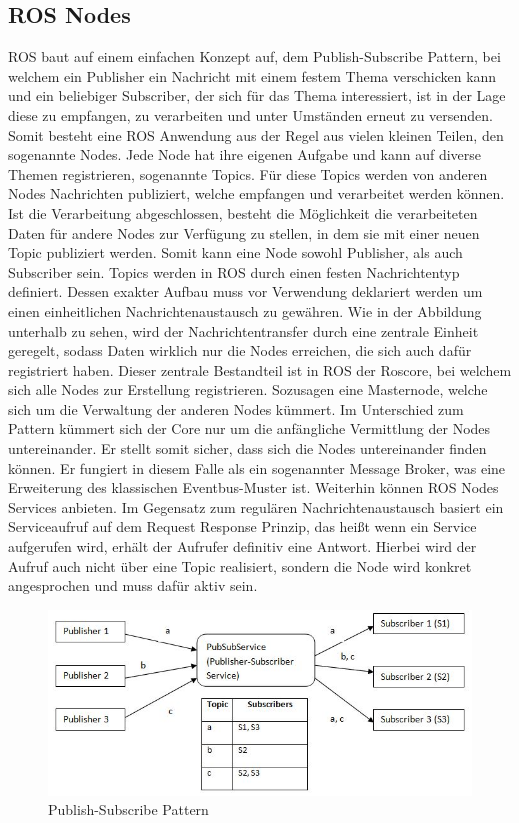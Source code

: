 \subsection{ROS Nodes}
ROS baut auf einem einfachen Konzept auf, dem Publish-Subscribe Pattern, bei welchem ein Publisher ein Nachricht mit einem festem Thema verschicken kann und ein beliebiger Subscriber, der sich für das Thema interessiert, ist in der Lage diese zu empfangen, zu verarbeiten und unter Umständen erneut zu versenden.  Somit besteht eine ROS Anwendung aus der Regel aus vielen kleinen Teilen, den sogenannte Nodes. Jede Node hat ihre eigenen Aufgabe und kann auf diverse Themen registrieren, sogenannte Topics. Für diese Topics werden von anderen Nodes Nachrichten publiziert, welche empfangen und verarbeitet werden können. Ist die Verarbeitung abgeschlossen, besteht die Möglichkeit die verarbeiteten Daten für andere Nodes zur Verfügung zu stellen, in dem sie mit einer neuen Topic publiziert werden. Somit kann eine Node sowohl Publisher, als auch Subscriber sein. 
Topics werden in ROS durch einen festen Nachrichtentyp definiert. Dessen exakter Aufbau muss vor Verwendung deklariert werden um einen einheitlichen Nachrichtenaustausch zu gewähren. Wie in der Abbildung unterhalb zu sehen, wird der Nachrichtentransfer durch eine zentrale Einheit geregelt, sodass Daten wirklich nur die Nodes erreichen, die sich auch dafür registriert haben. Dieser zentrale Bestandteil ist in ROS der Roscore, bei welchem sich alle Nodes zur Erstellung registrieren. Sozusagen eine Masternode, welche sich um die Verwaltung der anderen Nodes kümmert. Im Unterschied zum Pattern kümmert sich der Core nur um die anfängliche Vermittlung der Nodes untereinander. Er stellt somit sicher, dass sich die Nodes untereinander finden können. Er fungiert in diesem Falle als ein sogenannter Message Broker\cite{messagebroker}, was eine Erweiterung des klassischen Eventbus-Muster ist\cite{eventbus}. Weiterhin können ROS Nodes Services anbieten. Im Gegensatz zum regulären Nachrichtenaustausch basiert ein Serviceaufruf auf dem Request Response Prinzip, das heißt wenn ein Service aufgerufen wird, erhält der Aufrufer definitiv eine Antwort. Hierbei wird der Aufruf auch nicht über eine Topic realisiert, sondern die Node wird konkret angesprochen und muss dafür aktiv sein.\cite{rosbook}\cite{rosconcepts}
\begin{figure}[ht]
		\centering
	\includegraphics[scale=0.7]{Bilder/pubsub1.jpg}
	\caption[Publish-Subscribe Pattern]{Publish-Subscribe Pattern}

\end{figure}

